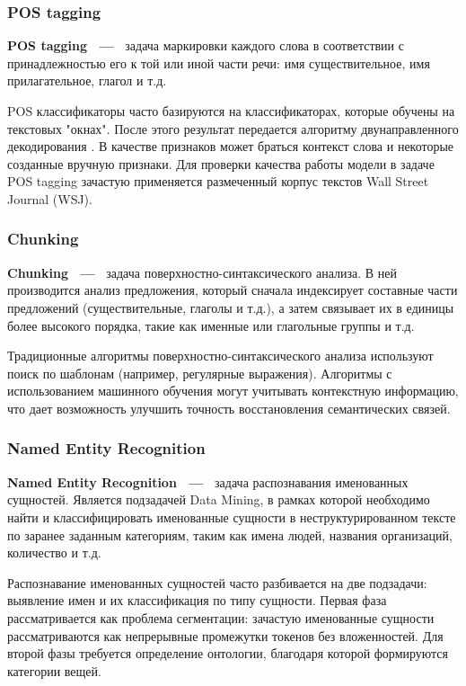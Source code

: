 \subsubsection{POS tagging}
\textbf{POS tagging ~---~} задача маркировки каждого слова в соответствии с принадлежностью его к той или иной части речи: имя существительное, имя прилагательное, глагол и т.д.

POS классификаторы часто базируются на классификаторах, которые обучены на текстовых "окнах". После этого результат передается алгоритму двунаправленного декодирования \autocite{watanabe-sumita-2002-bidirectional}. В качестве признаков может браться контекст слова и некоторые созданные вручную признаки.
Для проверки качества работы модели в задаче POS tagging зачастую применяется размеченный корпус текстов Wall Street Journal (WSJ).
\subsubsection{Chunking}
\textbf{Chunking  ~---~} задача поверхностно-синтаксического анализа. В  ней производится анализ предложения, который сначала индексирует составные части предложений (существительные, глаголы и т.д.), а затем связывает их в единицы более высокого порядка, такие как именные или глагольные группы и т.д.

Традиционные алгоритмы поверхностно-синтаксического анализа используют поиск по шаблонам (например, регулярные выражения). Алгоритмы с использованием машинного обучения могут учитывать контекстную информацию, что дает возможность улучшить точность восстановления семантических связей.
\subsubsection{Named Entity Recognition}
\textbf{Named Entity Recognition  ~---~} задача распознавания именованных сущностей. 
Является подзадачей Data Mining, в рамках которой необходимо найти и классифицировать именованные сущности в неструктурированном тексте по заранее заданным категориям, таким как имена людей, названия организаций, количество и т.д.

Распознавание именованных сущностей часто разбивается на две подзадачи: выявление имен и их классификация по типу сущности. Первая фаза рассматривается как проблема сегментации: зачастую именованные сущности рассматриваются как непрерывные промежутки токенов без вложенностей. Для второй фазы требуется определение онтологии, благодаря которой формируются категории вещей.

